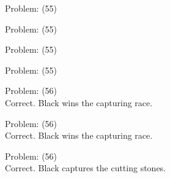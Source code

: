 \documentclass[11pt]{article}
\begin{document}
\begin{minipage}[t]{0.5\textwidth}
  {\centering
  
  Problem: (55)\\
  
  }
\end{minipage}
\begin{minipage}[t]{0.5\textwidth}
  {\centering
  
  Problem: (55)\\
  
  }
\end{minipage}
\begin{minipage}[t]{0.5\textwidth}
  {\centering
  
  Problem: (55)\\
  
  }
\end{minipage}
\begin{minipage}[t]{0.5\textwidth}
  {\centering
  
  Problem: (55)\\
  
  }
\end{minipage}
\begin{minipage}[t]{0.5\textwidth}
  {\centering
  
  Problem: (56)\\
  Correct. Black wins the capturing race.\\
  }
\end{minipage}
\begin{minipage}[t]{0.5\textwidth}
  {\centering
  
  Problem: (56)\\
  Correct. Black wins the capturing race.\\
  }
\end{minipage}
\begin{minipage}[t]{0.5\textwidth}
  {\centering
  
  Problem: (56)\\
  Correct. Black captures the cutting stones.\\
  }
\end{minipage}
\end{document}
